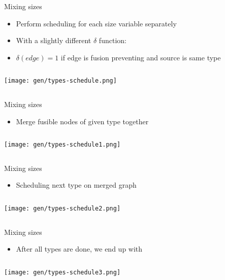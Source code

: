 \documentclass{beamer}
\begin{document}
\begin{frame}[fragile,b]{Mixing sizes}
\begin{itemize}
\item Perform scheduling for each size variable separately
\item With a slightly different $\delta$ function:
\item $\delta(edge) = 1$ if edge is fusion preventing and source is same type
\end{itemize}

\begin{columns}
\column[t]{5cm}

\column[t]{5cm}

\texttt{[image: gen/types-schedule.png]}

\end{columns}
\end{frame}


\begin{frame}[fragile,b]{Mixing sizes}
\begin{itemize}
\item Merge fusible nodes of given type together
\end{itemize}

\begin{columns}
\column[t]{5cm}

\column[t]{5cm}

\texttt{[image: gen/types-schedule1.png]}

\end{columns}
\end{frame}


\begin{frame}[fragile,b]{Mixing sizes}
\begin{itemize}
\item Scheduling next type on merged graph
\end{itemize}

\begin{columns}
\column[t]{5cm}

\column[t]{5cm}

\texttt{[image: gen/types-schedule2.png]}

\end{columns}
\end{frame}


\begin{frame}[fragile,b]{Mixing sizes}
\begin{itemize}
\item After all types are done, we end up with
\end{itemize}

\begin{columns}
\column[t]{5cm}

\column[t]{5cm}

\texttt{[image: gen/types-schedule3.png]}

\end{columns}
\end{frame}
\end{document}
